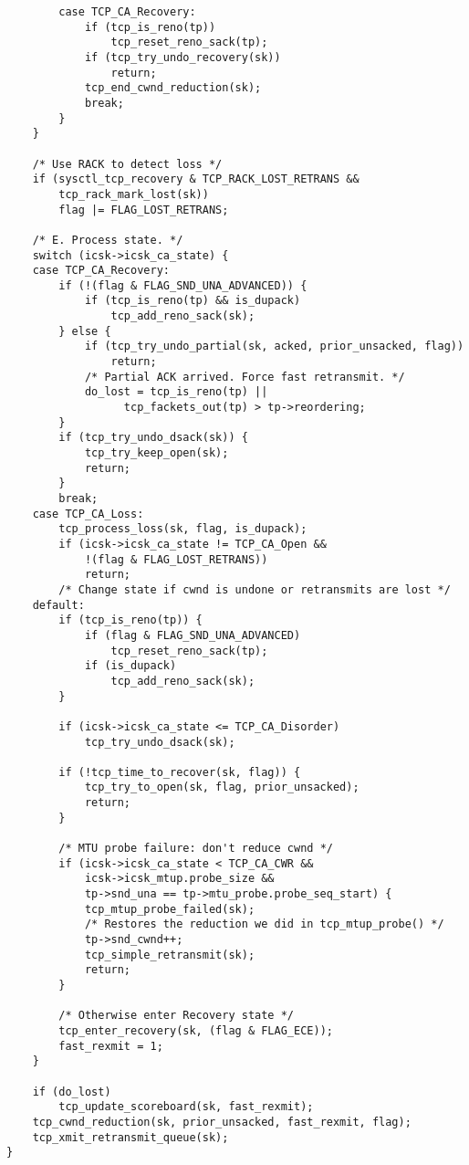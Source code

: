 \begin{verbatim}
		case TCP_CA_Recovery:
			if (tcp_is_reno(tp))
				tcp_reset_reno_sack(tp);
			if (tcp_try_undo_recovery(sk))
				return;
			tcp_end_cwnd_reduction(sk);
			break;
		}
	}

	/* Use RACK to detect loss */
	if (sysctl_tcp_recovery & TCP_RACK_LOST_RETRANS &&
	    tcp_rack_mark_lost(sk))
		flag |= FLAG_LOST_RETRANS;

	/* E. Process state. */
	switch (icsk->icsk_ca_state) {
	case TCP_CA_Recovery:
		if (!(flag & FLAG_SND_UNA_ADVANCED)) {
			if (tcp_is_reno(tp) && is_dupack)
				tcp_add_reno_sack(sk);
		} else {
			if (tcp_try_undo_partial(sk, acked, prior_unsacked, flag))
				return;
			/* Partial ACK arrived. Force fast retransmit. */
			do_lost = tcp_is_reno(tp) ||
				  tcp_fackets_out(tp) > tp->reordering;
		}
		if (tcp_try_undo_dsack(sk)) {
			tcp_try_keep_open(sk);
			return;
		}
		break;
	case TCP_CA_Loss:
		tcp_process_loss(sk, flag, is_dupack);
		if (icsk->icsk_ca_state != TCP_CA_Open &&
		    !(flag & FLAG_LOST_RETRANS))
			return;
		/* Change state if cwnd is undone or retransmits are lost */
	default:
		if (tcp_is_reno(tp)) {
			if (flag & FLAG_SND_UNA_ADVANCED)
				tcp_reset_reno_sack(tp);
			if (is_dupack)
				tcp_add_reno_sack(sk);
		}

		if (icsk->icsk_ca_state <= TCP_CA_Disorder)
			tcp_try_undo_dsack(sk);

		if (!tcp_time_to_recover(sk, flag)) {
			tcp_try_to_open(sk, flag, prior_unsacked);
			return;
		}

		/* MTU probe failure: don't reduce cwnd */
		if (icsk->icsk_ca_state < TCP_CA_CWR &&
		    icsk->icsk_mtup.probe_size &&
		    tp->snd_una == tp->mtu_probe.probe_seq_start) {
			tcp_mtup_probe_failed(sk);
			/* Restores the reduction we did in tcp_mtup_probe() */
			tp->snd_cwnd++;
			tcp_simple_retransmit(sk);
			return;
		}

		/* Otherwise enter Recovery state */
		tcp_enter_recovery(sk, (flag & FLAG_ECE));
		fast_rexmit = 1;
	}

	if (do_lost)
		tcp_update_scoreboard(sk, fast_rexmit);
	tcp_cwnd_reduction(sk, prior_unsacked, fast_rexmit, flag);
	tcp_xmit_retransmit_queue(sk);
}

\end{verbatim}
	
	

